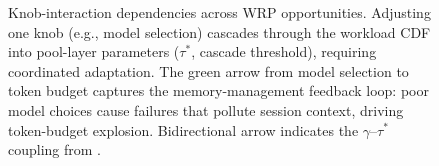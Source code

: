 \begin{opportunity}
\begin{figure}[t]
\caption{Knob-interaction dependencies across WRP opportunities.
Adjusting one knob (e.g., model selection) cascades through the
workload CDF into pool-layer parameters ($\tau^*$, cascade threshold),
requiring coordinated adaptation.  The green arrow from model
selection to token budget captures the memory-management feedback
loop: poor model choices cause failures that pollute session context,
driving token-budget explosion.  Bidirectional arrow indicates
the $\gamma$--$\tau^*$ coupling from .}
\label{fig:knob-interactions}
\end{figure}


\end{opportunity}
